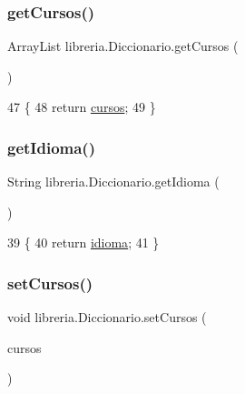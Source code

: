 \subsubsection{\texorpdfstring{get\+Cursos()}{getCursos()}}
{\footnotesize\ttfamily Array\+List libreria.\+Diccionario.\+get\+Cursos (\begin{DoxyParamCaption}{ }\end{DoxyParamCaption})\hspace{0.3cm}{\ttfamily [inline]}}


\begin{DoxyCode}
47                                  \{
48         \textcolor{keywordflow}{return} \mbox{\hyperlink{classlibreria_1_1_diccionario_a192b58fb0f0773bc0f857c0481a507c5}{cursos}};
49     \}
\end{DoxyCode}
\mbox{\label{classlibreria_1_1_diccionario_a8acf5a51be83afc6a5880dab17a513b5}} 
\subsubsection{\texorpdfstring{get\+Idioma()}{getIdioma()}}
{\footnotesize\ttfamily String libreria.\+Diccionario.\+get\+Idioma (\begin{DoxyParamCaption}{ }\end{DoxyParamCaption})\hspace{0.3cm}{\ttfamily [inline]}}


\begin{DoxyCode}
39                               \{
40         \textcolor{keywordflow}{return} \mbox{\hyperlink{classlibreria_1_1_diccionario_ab5efd7c7392d8c91283d0c5270408d70}{idioma}};
41     \}
\end{DoxyCode}
\mbox{\label{classlibreria_1_1_diccionario_a1f4a51c31338d5a50faab2fcf1b2cd1b}} 
\subsubsection{\texorpdfstring{set\+Cursos()}{setCursos()}}
{\footnotesize\ttfamily void libreria.\+Diccionario.\+set\+Cursos (\begin{DoxyParamCaption}\item[{Array\+List}]{cursos }\end{DoxyParamCaption})\hspace{0.3cm}{\ttfamily [inline]}}


